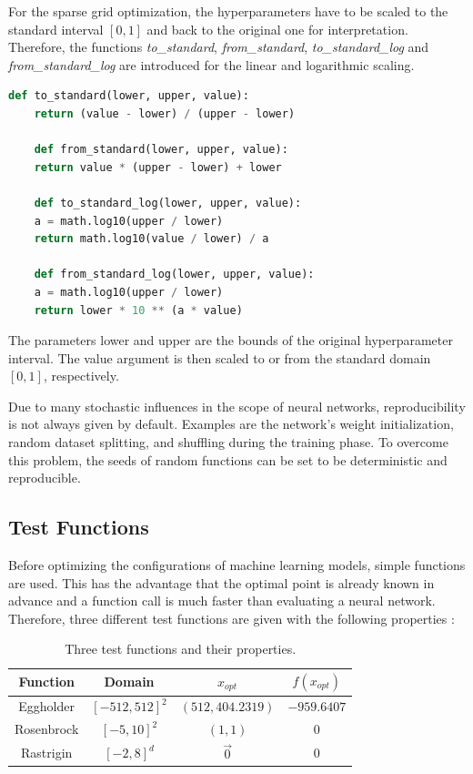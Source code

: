For the sparse grid optimization, the hyperparameters have to be scaled to the standard interval $ [0,1] $ and back to the original one for interpretation. Therefore, the functions \textit{to\_standard}, \textit{from\_standard}, \textit{to\_standard\_log} and \textit{from\_standard\_log} are introduced for the linear and logarithmic scaling. 

\begin{lstlisting}[language=Python]
	def to_standard(lower, upper, value):
	return (value - lower) / (upper - lower)
	
	def from_standard(lower, upper, value):
	return value * (upper - lower) + lower
	
	def to_standard_log(lower, upper, value):
	a = math.log10(upper / lower)
	return math.log10(value / lower) / a	
	
	def from_standard_log(lower, upper, value):
	a = math.log10(upper / lower)
	return lower * 10 ** (a * value)
\end{lstlisting}

The parameters lower and upper are the bounds of the original hyperparameter interval. The value argument is then scaled to or from the standard domain $ [0,1] $, respectively. \newline 

Due to many stochastic influences in the scope of neural networks, reproducibility is not always given by default. Examples are the network's weight initialization, random dataset splitting, and shuffling during the training phase. To overcome this problem, the seeds of random functions can be set to be deterministic and reproducible.


\subsection{Test Functions}

Before optimizing the configurations of machine learning models, simple functions are used. This has the advantage that the optimal point is already known in advance and a function call is much faster than evaluating a neural network. Therefore, three different test functions are given with the following properties \cite{valentin2016hierarchical}:

\begin{table}[H]
	\caption{ Three test functions and their properties.}
	\label{tab:test_functions}
	\centering
	\begin{tabular}{|c c c c|} 
		\hline
		Function & Domain & $x_{opt}$ & $ f(x_{opt}) $\\
		\hline
		Eggholder & $[-512, 512]^2 $ & $(512, 404.2319)$ & $ -959.6407 $ \\
		Rosenbrock & $[-5, 10]^2 $ & $(1,1)$ & $ 0 $ \\
		Rastrigin & $[-2, 8]^d $ & $\vec{0}$ & $ 0 $ \\
		\hline
	\end{tabular}
\end{table}

